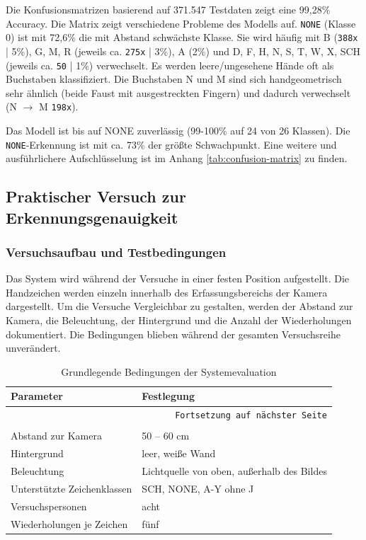 Die Konfusionsmatrizen basierend auf 371.547 Testdaten zeigt eine 99,28\% Accuracy. Die Matrix zeigt verschiedene Probleme des Modells auf. \texttt{NONE} (Klasse 0) ist mit 72,6\% die mit Abstand schwächste Klasse. Sie wird häufig mit B (\texttt{388x} | 5\%), G, M, R (jeweils ca. \texttt{275x} | 3\%), A (2\%) und D, F, H, N, S, T, W, X, SCH (jeweils ca. \texttt{50} | 1\%) verwechselt. Es werden leere/ungesehene Hände oft als Buchstaben klassifiziert.
 Die Buchstaben N und M sind sich handgeometrisch sehr ähnlich (beide Faust mit ausgestreckten Fingern) und dadurch verwechselt (N $\rightarrow$ M \texttt{198x}).

 Das Modell ist bis auf NONE zuverlässig (99-100\% auf 24 von 26 Klassen). Die \texttt{NONE}-\-Erkennung ist mit ca. 73\% der größte Schwachpunkt. Eine weitere und ausführlichere Aufschlüsselung ist im Anhang \ref{tab:confusion-matrix} zu finden.
 
\subsection{Praktischer Versuch zur Erkennungsgenauigkeit}\label{sec:praktischerversuch}

\subsubsection{Versuchsaufbau und Testbedingungen}\label{sec:versuchsaufbau}

Das System wird während der Versuche in einer festen Position aufgestellt. Die Handzeichen werden einzeln innerhalb des Erfassungsbereichs der Kamera dargestellt. Um die Versuche Vergleichbar zu gestalten, werden der Abstand zur Kamera, die Beleuchtung, der Hintergrund und die Anzahl der Wiederholungen dokumentiert. Die Bedingungen blieben während der gesamten Versuchsreihe unverändert.

\begin{longtable}{|p{}|p{}|}
    \hline
    \textbf{Parameter} & \textbf{Festlegung} \\
    \hline
    \endfirsthead
    \hline
    \multicolumn{2}{r}{\texttt{Fortsetzung auf nächster Seite}} \\
    \endfoot
    \caption{Grundlegende Bedingungen der Systemevaluation}
    \label{tab:versuchsbedingungen} \\
    \endlastfoot
    Abstand zur Kamera & 50 -- 60 cm \\
    \hline
    Hintergrund & leer, weiße Wand \\
    \hline
    Beleuchtung & Lichtquelle von oben, außerhalb des Bildes \\
    \hline
    Unterstützte Zeichenklassen & SCH, NONE, A-Y ohne J \\
    \hline
    Versuchspersonen & acht \\
    \hline
    Wiederholungen je Zeichen &  fünf \\
    \hline
\end{longtable}

